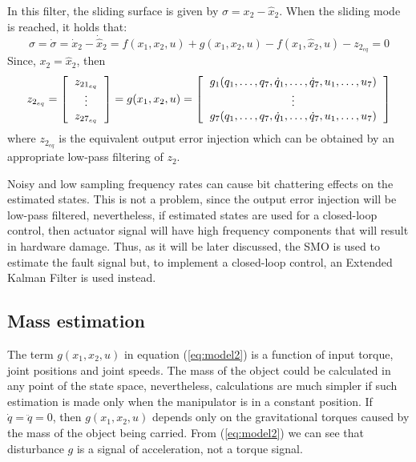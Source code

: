 \documentclass[a4paper, 10pt]{article}
\begin{document}
In this filter, the sliding surface is given by $\sigma = x_2 - \hat{x}_2$. When the sliding mode is reached, it holds that:
\[\sigma = \dot{\sigma} = \dot{x}_2 - \dot{\hat{x}}_2 = f(x_1, x_2, u) + g(x_1, x_2, u) - f(x_1, \hat{x}_2, u) - z_{2_{eq}} = 0\]
Since,  $x_2 = \hat{x}_2$, then
\begin{equation*}
  z_{2_{eq}} = \left[\begin{tabular}{c}
      $z_{21_{eq}}$\\
      $\vdots$\\
      $z_{27_{eq}}$
    \end{tabular}\right] = g(x_1, x_2, u) =
  \left[\begin{tabular}{c}
      $g_1(q_1,\dots, q_7, \dot{q}_1, \dots, \dot{q}_7, u_1, \dots,u_7)$\\
      $\vdots$\\
      $g_7(q_1,\dots, q_7, \dot{q}_1, \dots, \dot{q}_7, u_1, \dots,u_7)$
    \end{tabular}\right] 
\end{equation*}
where $z_{2_{eq}}$ is the equivalent output error injection which can be obtained by an appropriate low-pass filtering of $z_2$.

Noisy and low sampling frequency rates can cause bit chattering effects on the estimated states. This is not a problem, since the output error injection will be low-pass filtered, nevertheless, if estimated states are used for a closed-loop control, then actuator signal will have high frequency components that will result in hardware damage. Thus, as it will be later discussed, the SMO is used to estimate the fault signal but, to implement a closed-loop control, an Extended Kalman Filter is used instead. 

\subsection{Mass estimation}
The term $g(x_1, x_2, u)$ in equation (\ref{eq:model2}) is a function of input torque, joint positions and joint speeds. The mass of the object could be calculated in any point of the state space, nevertheless, calculations are much simpler if such estimation is made only when the manipulator is in a constant position. If $\dot{q}= \ddot{q} = 0$, then $g(x_1, x_2, u)$ depends only on the gravitational torques caused by the mass of the object being carried. From (\ref{eq:model2}) we can see that disturbance $g$ is a signal of acceleration, not a torque signal. 
\end{document}
